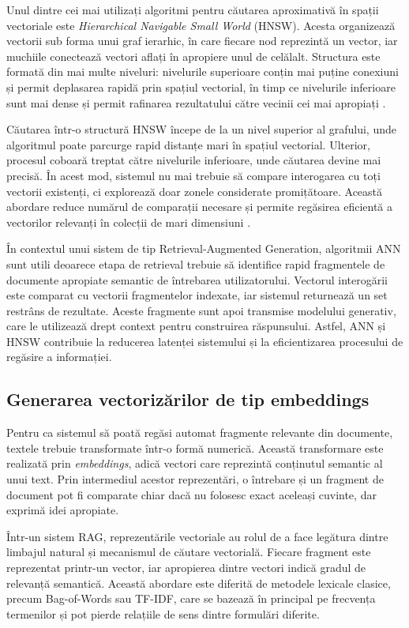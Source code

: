 \documentclass[12pt, a4paper, oneside, romanian]{teza-upb}
\begin{document}
Unul dintre cei mai utilizați algoritmi pentru căutarea aproximativă în spații vectoriale este \textit{Hierarchical Navigable Small World} (HNSW). Acesta organizează vectorii sub forma unui graf ierarhic, în care fiecare nod reprezintă un vector, iar muchiile conectează vectori aflați în apropiere unul de celălalt. Structura este formată din mai multe niveluri: nivelurile superioare conțin mai puține conexiuni și permit deplasarea rapidă prin spațiul vectorial, în timp ce nivelurile inferioare sunt mai dense și permit rafinarea rezultatului către vecinii cei mai apropiați \cite{malkov2018hnsw}.

Căutarea într-o structură HNSW începe de la un nivel superior al grafului, unde algoritmul poate parcurge rapid distanțe mari în spațiul vectorial. Ulterior, procesul coboară treptat către nivelurile inferioare, unde căutarea devine mai precisă. În acest mod, sistemul nu mai trebuie să compare interogarea cu toți vectorii existenți, ci explorează doar zonele considerate promițătoare. Această abordare reduce numărul de comparații necesare și permite regăsirea eficientă a vectorilor relevanți în colecții de mari dimensiuni \cite{malkov2018hnsw}.

În contextul unui sistem de tip Retrieval-Augmented Generation, algoritmii ANN sunt utili deoarece etapa de retrieval trebuie să identifice rapid fragmentele de documente apropiate semantic de întrebarea utilizatorului. Vectorul interogării este comparat cu vectorii fragmentelor indexate, iar sistemul returnează un set restrâns de rezultate. Aceste fragmente sunt apoi transmise modelului generativ, care le utilizează drept context pentru construirea răspunsului. Astfel, ANN și HNSW contribuie la reducerea latenței sistemului și la eficientizarea procesului de regăsire a informației.

\subsection{Generarea vectorizărilor de tip embeddings}

Pentru ca sistemul să poată regăsi automat fragmente relevante din documente, textele trebuie transformate într-o formă numerică. Această transformare este realizată prin \textit{embeddings}, adică vectori care reprezintă conținutul semantic al unui text. Prin intermediul acestor reprezentări, o întrebare și un fragment de document pot fi comparate chiar dacă nu folosesc exact aceleași cuvinte, dar exprimă idei apropiate.

Într-un sistem RAG, reprezentările vectoriale au rolul de a face legătura dintre limbajul natural și mecanismul de căutare vectorială. Fiecare fragment este reprezentat printr-un vector, iar apropierea dintre vectori indică gradul de relevanță semantică. Această abordare este diferită de metodele lexicale clasice, precum Bag-of-Words sau TF-IDF, care se bazează în principal pe frecvența termenilor și pot pierde relațiile de sens dintre formulări diferite.
\end{document}

